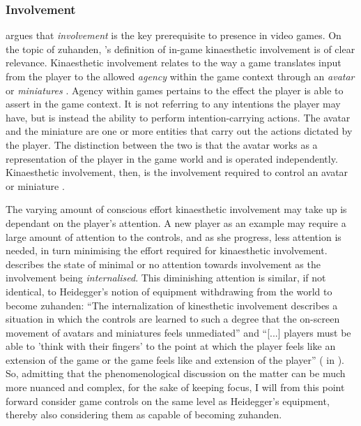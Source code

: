 \subsubsection{Involvement}
 argues that \textit{involvement} is the key prerequisite to presence in video games. On the topic of zuhanden, \citeauthor{calleja}'s \citeyear{calleja} definition of in-game kinaesthetic involvement is of clear relevance. Kinaesthetic involvement relates to the way a game translates input from the player to the allowed \textit{agency} within the game context through an \textit{avatar} or \textit{miniatures} \cite{calleja}. Agency within games pertains to the effect the player is able to assert in the game context. It is not referring to any intentions the player may have, but is instead the ability to perform intention-carrying actions. The avatar and the miniature are one or more entities that carry out the actions dictated by the player. The distinction between the two is that the avatar works as a representation of the player in the game world and is operated independently. Kinaesthetic involvement, then, is the involvement required to control an avatar or miniature \cite{calleja}.

The varying amount of conscious effort kinaesthetic involvement may take up is dependant on the player's attention. A new player as an example may require a large amount of attention to the controls, and as she progress, less attention is needed, in turn minimising the effort required for kinaesthetic involvement.  describes the state of minimal or no attention towards involvement as the involvement being \textit{internalised}. This diminishing attention is similar, if not identical, to Heidegger's notion of equipment withdrawing from the world to become zuhanden: ``The internalization of kinesthetic involvement describes a situation in which the controls are learned to such a degree that the on-screen movement of avatars and miniatures feels unmediated'' \cite[p. 68]{calleja} and ``[...] players must be able to 'think with their fingers' to the point at which the player feels like an extension of the game or the game feels like and extension of the player'' ( in ). So, admitting that the phenomenological discussion on the matter can be much more nuanced and complex, for the sake of keeping focus, I will from this point forward consider game controls on the same level as Heidegger's equipment, thereby also considering them as capable of becoming zuhanden.

